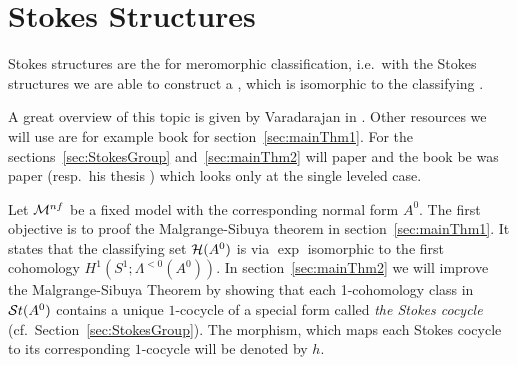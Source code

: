 \chapter{Stokes Structures}
Stokes structures are the  for meromorphic
classification, i.e.\ with the Stokes structures we are able to construct a
, which is isomorphic to the classifying .

A great overview of this topic is given by Varadarajan in
\cite{Varadarajan96linearmeromorphic}. Other resources we will use are for
example  book \cite[section II]{sabbah2007isomonodromic} for
section~\ref{sec:mainThm1}.
For the sections~\ref{sec:StokesGroup} and~\ref{sec:mainThm2} will
 paper \cite{Loday1994} and the book \cite{Loday2014}
be  was  paper \cite{boalch}
(resp.\ his thesis \cite{thboalch}) which looks only at the single leveled
case.

Let $\mathcal{M}^{nf}$ be a fixed model with the corresponding normal form $A^0$.
The first objective is to proof the Malgrange-Sibuya theorem
in section~\ref{sec:mainThm1}. It states that the classifying set $\mathcal{H}(A^0)$
is via $\exp$ isomorphic to the first cohomology $H^1(S^1;\Lambda^{<0}(A^0))$.
In section~\ref{sec:mainThm2} we will improve the Malgrange-Sibuya Theorem by
showing that each 1-cohomology class in $\mathcal{S}{}t(A^0)$ contains a unique
$1$-cocycle of a special form called \emph{the Stokes cocycle}
(cf.\ Section~\ref{sec:StokesGroup}).
The morphism, which maps each Stokes cocycle to its corresponding $1$-cocycle
will be denoted by $h$.

